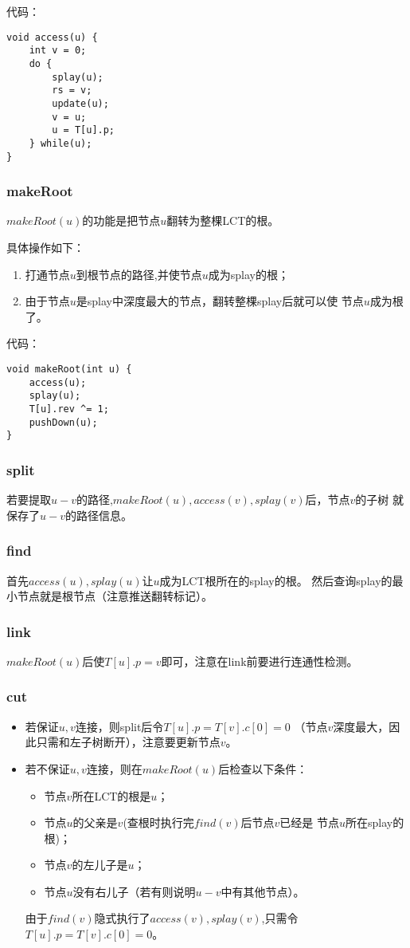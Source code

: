 代码：
\begin{lstlisting}[title=access]
void access(u) {
    int v = 0;
    do {
        splay(u);
        rs = v;
        update(u);
        v = u;
        u = T[u].p;
    } while(u);
}
\end{lstlisting}

\subsubsection{makeRoot}
$makeRoot(u)$的功能是把节点$u$翻转为整棵LCT的根。

具体操作如下：

\begin{enumerate}
    \item 打通节点$u$到根节点的路径,并使节点$u$成为splay的根；
    \item 由于节点$u$是splay中深度最大的节点，翻转整棵splay后就可以使
    节点$u$成为根了。
\end{enumerate}

代码：

\begin{lstlisting}[title=makeRoot]
void makeRoot(int u) {
    access(u);
    splay(u);
    T[u].rev ^= 1;
    pushDown(u);
}
\end{lstlisting}
\subsubsection{split}
若要提取$u-v$的路径,$makeRoot(u),access(v),splay(v)$后，节点$v$的子树
就保存了$u-v$的路径信息。
\subsubsection{find}\label{LCTFind}
首先$access(u),splay(u)$让$u$成为LCT根所在的splay的根。
然后查询splay的最小节点就是根节点（注意推送翻转标记）。
\subsubsection{link}
$makeRoot(u)$后使$T[u].p=v$即可，注意在link前要进行连通性检测。
\subsubsection{cut}

\begin{itemize}
    \item 若保证$u,v$连接，则split后令$T[u].p=T[v].c[0]=0$
    （节点$v$深度最大，因此只需和左子树断开），注意要更新节点$v$。
    \item 若不保证$u,v$连接，则在$makeRoot(u)$后检查以下条件：
    \begin{itemize}
        \item 节点$v$所在LCT的根是$u$；
        \item 节点$u$的父亲是$v$(查根时执行完$find(v)$后节点$v$已经是
        节点$u$所在splay的根)；
        \item 节点$v$的左儿子是$u$；
        \item 节点$u$没有右儿子（若有则说明$u-v$中有其他节点）。
    \end{itemize}
    由于$find(v)$隐式执行了$access(v),splay(v)$,只需令
    $T[u].p=T[v].c[0]=0$。
\end{itemize}

